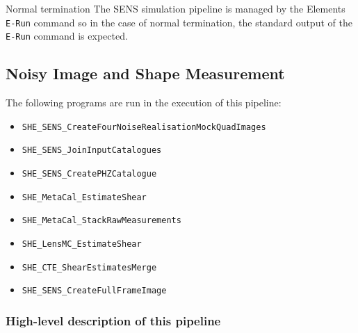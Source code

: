 \documentclass[11pt]{EuclidVIS}
\numberwithin{table}{section}
\numberwithin{figure}{section}
\begin{document}
\noindent Normal termination
The SENS simulation pipeline is managed by the Elements \texttt{E-Run} command so in the case of normal termination, the standard output of the \texttt{E-Run} command is expected.


\subsection{Noisy Image and Shape Measurement}

The following programs are run in the execution of this pipeline:

\begin{itemize}
    \item \texttt{SHE\_SENS\_CreateFourNoiseRealisationMockQuadImages}
    \item \texttt{SHE\_SENS\_JoinInputCatalogues}
    \item \texttt{SHE\_SENS\_CreatePHZCatalogue}
    \item \texttt{SHE\_MetaCal\_EstimateShear}
    \item \texttt{SHE\_MetaCal\_StackRawMeasurements}
    \item \texttt{SHE\_LensMC\_EstimateShear}
    \item \texttt{SHE\_CTE\_ShearEstimatesMerge}
    \item \texttt{SHE\_SENS\_CreateFullFrameImage}
\end{itemize}

\subsubsection{High-level description of this pipeline}
\end{document}
